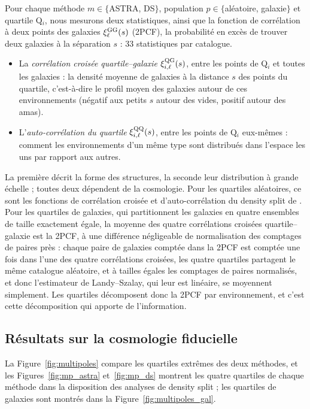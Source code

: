 Pour chaque méthode $m\in\{$ASTRA, DS$\}$, population $p\in\{$aléatoire, galaxie$\}$ et quartile Q$_i$, nous mesurons deux statistiques, ainsi que la fonction de corrélation à deux points des galaxies $\xi^{\rm GG}_\ell(s)$ (2PCF), la probabilité en excès de trouver deux galaxies à la séparation $s$ : 33 statistiques par catalogue.
\begin{itemize}
\item La \emph{corrélation croisée quartile--galaxie} $\xi^{\rm QG}_{i,\ell}(s)$, entre les points de Q$_i$ et toutes les galaxies : la densité moyenne de galaxies à la distance $s$ des points du quartile, c'est-à-dire le profil moyen des galaxies autour de ces environnements (négatif aux petits $s$ autour des vides, positif autour des amas).
\item L'\emph{auto-corrélation du quartile} $\xi^{\rm QQ}_{i,\ell}(s)$, entre les points de Q$_i$ eux-mêmes : comment les environnements d'un même type sont distribués dans l'espace les uns par rapport aux autres.
\end{itemize}
La première décrit la forme des structures, la seconde leur distribution à grande échelle ; toutes deux dépendent de la cosmologie. Pour les quartiles aléatoires, ce sont les fonctions de corrélation croisée et d'auto-corrélation du density split de \cite{Paillas2023}. Pour les quartiles de galaxies, qui partitionnent les galaxies en quatre ensembles de taille exactement égale, la moyenne des quatre corrélations croisées quartile--galaxie est la 2PCF, à une différence négligeable de normalisation des comptages de paires près : chaque paire de galaxies comptée dans la 2PCF est comptée une fois dans l'une des quatre corrélations croisées, les quatre quartiles partagent le même catalogue aléatoire, et à tailles égales les comptages de paires normalisés, et donc l'estimateur de Landy--Szalay, qui leur est linéaire, se moyennent simplement. Les quartiles décomposent donc la 2PCF par environnement, et c'est cette décomposition qui apporte de l'information.

\subsection{Résultats sur la cosmologie fiducielle}

La Figure~\ref{fig:multipoles} compare les quartiles extrêmes des deux méthodes, et les Figures~\ref{fig:mp_astra} et~\ref{fig:mp_ds} montrent les quatre quartiles de chaque méthode dans la disposition des analyses de density split \cite{Paillas2023} ; les quartiles de galaxies sont montrés dans la Figure~\ref{fig:multipoles_gal}.

